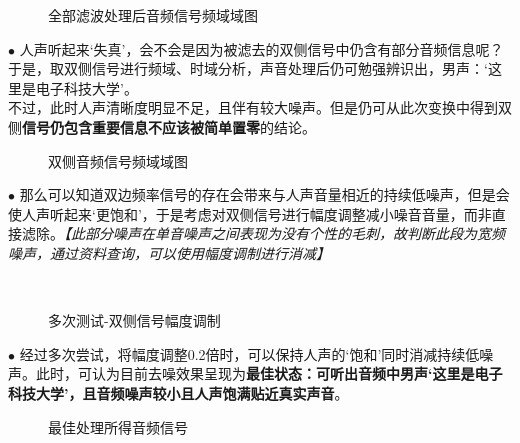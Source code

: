 \begin{figure}[H]
    \centering
    \hfill 
    \caption{全部滤波处理后音频信号频域域图}
\end{figure}
\newpage
$\bullet$ 人声听起来‘失真’，会不会是因为被滤去的双侧信号中仍含有部分音频信息呢？\\
\indent 于是，取双侧信号进行频域、时域分析，声音处理后仍可勉强辨识出，男声：‘这里是电子科技大学’。\\
\indent 不过，此时人声清晰度明显不足，且伴有较大噪声。但是仍可从此次变换中得到双侧\textbf{信号仍包含重要信息不应该被简单置零}的结论。\\
\begin{figure}[H]
    \centering
    \hfill 
    \caption{双侧音频信号频域域图}
\end{figure}
$\bullet$ 那么可以知道双边频率信号的存在会带来与人声音量相近的持续低噪声，但是会使人声听起来‘更饱和’，于是考虑对双侧信号进行幅度调整减小噪音音量，而非直接滤除。\textit{【此部分噪声在单音噪声之间表现为没有个性的毛刺，故判断此段为宽频噪声，通过资料查询，可以使用幅度调制进行消减】}
\begin{figure}[H]
    \centering
    \
    \hfill 
    \hfill 
    
    \hfill 
    \hfill 
    \hfill 
    \caption{多次测试-双侧信号幅度调制}
\end{figure} 
$\bullet$ 经过多次尝试，将幅度调整0.2倍时，可以保持人声的‘饱和’同时消减持续低噪声。此时，可认为目前去噪效果呈现为\textbf{最佳状态：可听出音频中男声‘这里是电子科技大学’，且音频噪声较小且人声饱满贴近真实声音}。
\begin{figure}[H]
    \centering
    \hfill 
    \caption{最佳处理所得音频信号}
\end{figure}